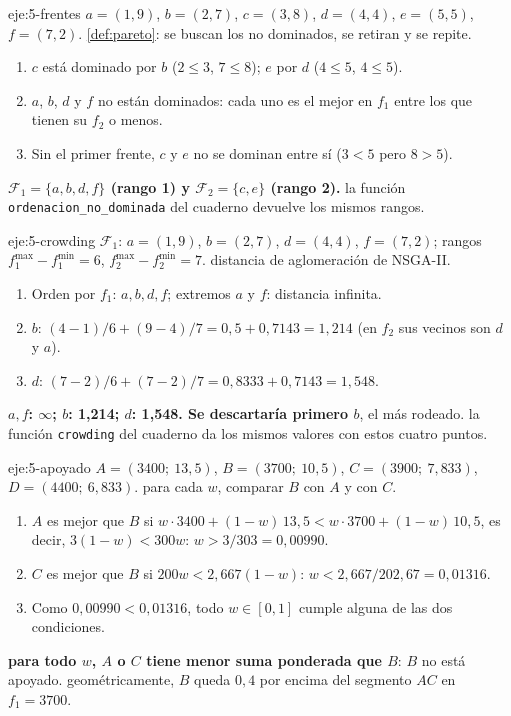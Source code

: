 \begin{solucion}{eje:5-frentes}
\datos $a=(1,9)$, $b=(2,7)$, $c=(3,8)$, $d=(4,4)$, $e=(5,5)$, $f=(7,2)$.
\planteamiento \cref{def:pareto}: se buscan los no dominados, se retiran y se repite.
\pasos
\begin{enumerate}[label=\arabic*.]
  \item $c$ está dominado por $b$ ($2\le 3$, $7\le 8$); $e$ por $d$ ($4\le 5$, $4\le 5$).
  \item $a$, $b$, $d$ y $f$ no están dominados: cada uno es el mejor en $f_1$ entre los que tienen su $f_2$ o menos.
  \item Sin el primer frente, $c$ y $e$ no se dominan entre sí ($3<5$ pero $8>5$).
\end{enumerate}
\resultado \textbf{$\mathcal{F}_1=\{a,b,d,f\}$ (rango 1) y $\mathcal{F}_2=\{c,e\}$ (rango 2).}
\comprobacion la función \texttt{ordenacion\_no\_dominada} del cuaderno devuelve los mismos rangos.
\end{solucion}

\begin{solucion}{eje:5-crowding}
\datos $\mathcal{F}_1$: $a=(1,9)$, $b=(2,7)$, $d=(4,4)$, $f=(7,2)$; rangos $f_1^{\max}-f_1^{\min}=6$, $f_2^{\max}-f_2^{\min}=7$.
\planteamiento distancia de aglomeración de NSGA-II.
\pasos
\begin{enumerate}[label=\arabic*.]
  \item Orden por $f_1$: $a,b,d,f$; extremos $a$ y $f$: distancia infinita.
  \item $b$: $(4-1)/6+(9-4)/7=0{,}5+0{,}7143=1{,}214$ (en $f_2$ sus vecinos son $d$ y $a$).
  \item $d$: $(7-2)/6+(7-2)/7=0{,}8333+0{,}7143=1{,}548$.
\end{enumerate}
\resultado \textbf{$a,f$: $\infty$; $b$: 1,214; $d$: 1,548. Se descartaría primero $b$}, el más rodeado.
\comprobacion la función \texttt{crowding} del cuaderno da los mismos valores con estos cuatro puntos.
\end{solucion}

\begin{solucion}{eje:5-apoyado}
\datos $A=(3400;\ 13{,}5)$, $B=(3700;\ 10{,}5)$, $C=(3900;\ 7{,}833)$, $D=(4400;\ 6{,}833)$.
\planteamiento para cada $w$, comparar $B$ con $A$ y con $C$.
\pasos
\begin{enumerate}[label=\arabic*.]
  \item $A$ es mejor que $B$ si $w\cdot 3400+(1-w)\,13{,}5<w\cdot 3700+(1-w)\,10{,}5$, es decir, $3(1-w)<300w$: $w>3/303=0{,}00990$.
  \item $C$ es mejor que $B$ si $200w<2{,}667(1-w)$: $w<2{,}667/202{,}67=0{,}01316$.
  \item Como $0{,}00990<0{,}01316$, todo $w\in[0,1]$ cumple alguna de las dos condiciones.
\end{enumerate}
\resultado \textbf{para todo $w$, $A$ o $C$ tiene menor suma ponderada que $B$}: $B$ no está apoyado.
\comprobacion geométricamente, $B$ queda $0{,}4$ por encima del segmento $AC$ en $f_1=3700$.
\end{solucion}

